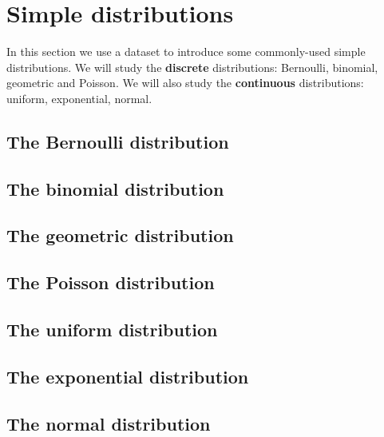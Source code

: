 \documentclass[
  british,
]{book}
\begin{document}
\FloatBarrier

\FloatBarrier

\hypertarget{simple}{%
\chapter{Simple distributions}\label{simple}}

In this section we use a dataset to introduce some commonly-used simple distributions. We will study the \textbf{discrete} distributions: Bernoulli, binomial, geometric and Poisson. We will also study the \textbf{continuous} distributions: uniform, exponential, normal.

\hypertarget{the-bernoulli-distribution}{%
\section{The Bernoulli distribution}\label{the-bernoulli-distribution}}

\hypertarget{binomial}{%
\section{The binomial distribution}\label{binomial}}

\hypertarget{the-geometric-distribution}{%
\section{The geometric distribution}\label{the-geometric-distribution}}

\hypertarget{the-poisson-distribution}{%
\section{The Poisson distribution}\label{the-poisson-distribution}}

\hypertarget{the-uniform-distribution}{%
\section{The uniform distribution}\label{the-uniform-distribution}}

\hypertarget{the-exponential-distribution}{%
\section{The exponential distribution}\label{the-exponential-distribution}}

\hypertarget{normal}{%
\section{The normal distribution}\label{normal}}
\end{document}
